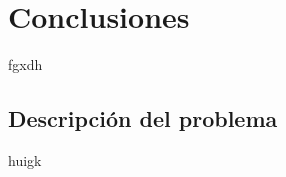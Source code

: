 \chapter{Conclusiones}\label{chap:Conclusiones}

fgxdh

\section{Descripción del problema}

huigk



